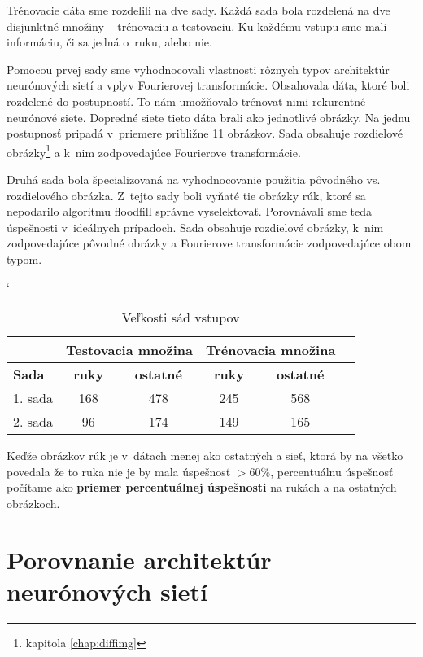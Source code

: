 Trénovacie dáta sme rozdelili na dve sady. Každá sada bola rozdelená na dve disjunktné množiny -- trénovaciu a testovaciu. Ku každému vstupu sme mali informáciu, či sa jedná o~ruku, alebo nie.

Pomocou prvej sady sme vyhodnocovali vlastnosti rôznych typov architektúr neurónových sietí a vplyv Fourierovej transformácie. Obsahovala dáta, ktoré boli rozdelené do postupností. To nám umožňovalo trénovať nimi rekurentné neurónové siete. Dopredné siete tieto dáta brali ako jednotlivé obrázky. Na jednu postupnosť pripadá v~priemere približne 11 obrázkov. Sada obsahuje rozdielové obrázky\footnote{kapitola \ref{chap:diffimg}} a k~nim zodpovedajúce Fourierove transformácie.

Druhá sada bola špecializovaná na vyhodnocovanie použitia pôvodného vs. rozdielového obrázka. Z~tejto sady boli vyňaté tie obrázky rúk, ktoré sa nepodarilo algoritmu floodfill správne vyselektovať. Porovnávali sme teda úspešnosti v~ideálnych prípadoch. Sada obsahuje rozdielové obrázky, k~nim zodpovedajúce pôvodné obrázky a Fourierove transformácie zodpovedajúce obom typom.

\begin{table}[h]
\catcode` %
\centering
\begin{tabular}{|l|c|c|c|c|c|}
\cline{2-5}
\multicolumn{1}{l}{} & \multicolumn{2}{|c|}{\textbf{Testovacia množina}} & \multicolumn{2}{c|}{\textbf{Trénovacia množina}}\\ 
\hline
\textbf{Sada} & \textbf{ruky} & \textbf{ostatné} & \textbf{ruky} & \textbf{ostatné} \\ \hline
1. sada & 168 & 478 & 245  & 568 \\ \hline
2. sada & 96 & 174 & 149 & 165 \\ 
\hline
\end{tabular}
\caption{Veľkosti sád vstupov}
\label{tab:neuroncountcmp}
\end{table}

Keďže obrázkov rúk je v~dátach menej ako ostatných a sieť, ktorá by na všetko povedala že to ruka nie je by mala úspešnosť $>60\%$, percentuálnu úspešnosť počítame ako \textbf{priemer percentuálnej úspešnosti} na rukách a na ostatných obrázkoch.

\section{Porovnanie architektúr neurónových sietí}
\label{chap:experiments_arch}

